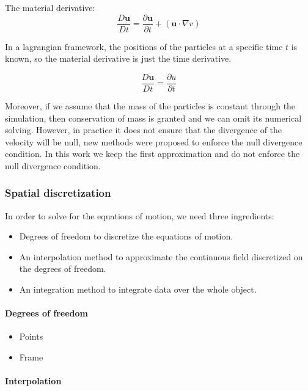 \documentclass[11pt, oneside, a4paper]{memoir}
\begin{document}
The material derivative:
\begin{equation}
\frac{D\mathbf{u}}{Dt} = \frac{\partial \mathbf{u}}{\partial t} + (\mathbf{u} \cdot \nabla v)
\end{equation}

In a lagrangian framework, the positions of the particles at a specific time $t$ is known, so the material derivative is just the time derivative.

\begin{equation}
\frac{D\mathbf{u}}{Dt} = \frac{\partial u}{\partial t}
\end{equation}

Moreover, if we assume that the mass of the particles is constant through the simulation, then conservation of mass is granted and we can omit its numerical solving. However, in practice it does not ensure that the divergence of the velocity will be null, new methods were proposed to enforce the null divergence condition. In this work we keep the first approximation and do not enforce the null divergence condition.

\subsubsection{Spatial discretization}

In order to solve for the equations of motion, we need three ingredients:
\begin{itemize}
\item Degrees of freedom to discretize the equations of motion.
\item An interpolation method to approximate the continuous field discretized on the degrees of freedom.
\item An integration method to integrate data over the whole object.
\end{itemize}

\paragraph{Degrees of freedom}
\begin{itemize}
\item Points
\item Frame
\end{itemize}

\paragraph{Interpolation}
\end{document}

